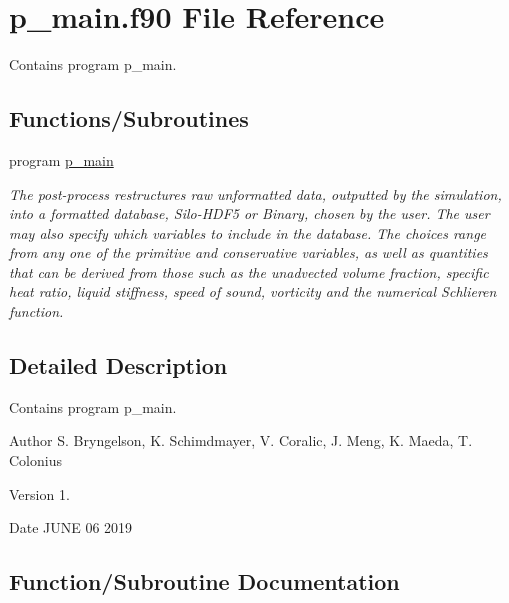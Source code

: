 \hypertarget{p__main_8f90}{}\section{p\+\_\+main.\+f90 File Reference}
\label{p__main_8f90}


Contains program p\+\_\+main.  


\subsection*{Functions/\+Subroutines}
\begin{DoxyCompactItemize}
\item 
program \hyperlink{p__main_8f90_aeec10ee8e2940c953967da3e374e1579}{p\+\_\+main}
\begin{DoxyCompactList}\small\item\em The post-\/process restructures raw unformatted data, outputted by the simulation, into a formatted database, Silo-\/\+H\+D\+F5 or Binary, chosen by the user. The user may also specify which variables to include in the database. The choices range from any one of the primitive and conservative variables, as well as quantities that can be derived from those such as the unadvected volume fraction, specific heat ratio, liquid stiffness, speed of sound, vorticity and the numerical Schlieren function. \end{DoxyCompactList}\end{DoxyCompactItemize}


\subsection{Detailed Description}
Contains program p\+\_\+main. 

\begin{DoxyAuthor}{Author}
S. Bryngelson, K. Schimdmayer, V. Coralic, J. Meng, K. Maeda, T. Colonius 
\end{DoxyAuthor}
\begin{DoxyVersion}{Version}
1. 
\end{DoxyVersion}
\begin{DoxyDate}{Date}
J\+U\+NE 06 2019 
\end{DoxyDate}


\subsection{Function/\+Subroutine Documentation}
\mbox{\label{p__main_8f90_aeec10ee8e2940c953967da3e374e1579}} 
